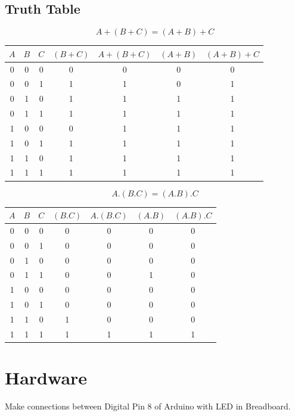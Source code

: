 \documentclass[letterpaper, 10 pt, conference]{ieeeconf}
\begin{document}
\subsection*{\normalsize Truth Table}
{
\[ A + (B + C) = (A + B) + C  \]
\centering
\begin{tabular}{|c|c|c|c|c|c|c|}
\hline
${A}$&${B}$&${C}$&${(B+C)}$&${A+(B+C)}$&${(A+B)}$&${(A+B)+C}$\\
\hline
0&0&0&0&0&0&0\\%
\hline
0&0&1&1&1&0&1\\%
\hline
0&1&0&1&1&1&1\\%
\hline
0&1&1&1&1&1&1\\%
\hline
1&0&0&0&1&1&1\\%
\hline
1&0&1&1&1&1&1\\%
\hline
1&1&0&1&1&1&1\\%
\hline
1&1&1&1&1&1&1\\%
\hline
\end{tabular}\par
}
\vspace{5mm} %
\[ A . (B . C) = (A . B) . C  \]
{
\centering
\begin{tabular}{|c|c|c|c|c|c|c|}
\hline
${A}$&${B}$&${C}$&${(B.C)}$&${A.(B.C)}$&${(A.B)}$&${(A.B).C}$\\
\hline
0&0&0&0&0&0&0\\%
\hline
0&0&1&0&0&0&0\\%
\hline
0&1&0&0&0&0&0\\%
\hline
0&1&1&0&0&1&0\\%
\hline
1&0&0&0&0&0&0\\%
\hline
1&0&1&0&0&0&0\\%
\hline
1&1&0&1&0&0&0\\%
\hline
1&1&1&1&1&1&1\\%
\hline
\end{tabular}\par
}
\vspace{5mm} %
\section{Hardware}
Make connections between Digital Pin 8 of Arduino with LED in Breadboard.
\vspace{5mm} %
\end{document}
